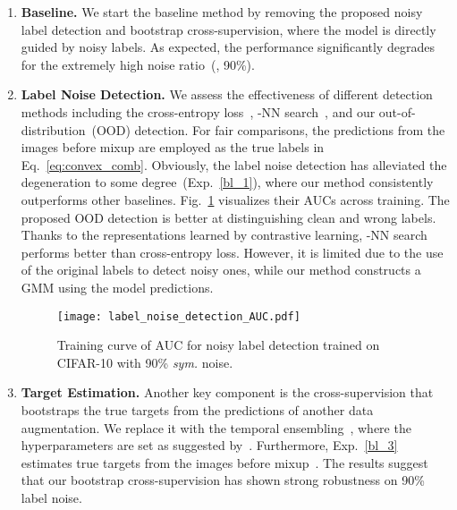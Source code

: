 \begin{enumerate}[label=\color{red!70!black}(\roman*),wide,labelindent=0pt,itemsep=0ex,parsep=0pt,topsep=0pt]
\item\label{bl_1} \textbf{Baseline.}\quad
We start the baseline method by removing the proposed noisy label detection and bootstrap cross-supervision, where the model is directly guided by noisy labels.  As expected, the performance significantly degrades for the extremely high noise ratio~(\ie, 90\%).


\item\label{bl_2} \textbf{Label Noise Detection.}\quad
We assess the effectiveness of different detection methods including the cross-entropy loss~\cite{arazo2019unsupervised,li2020dividemix}, -NN search~\cite{ortego2021multi}, and our out-of-distribution~(OOD) detection. For fair comparisons, the predictions from the images before mixup are employed as the true labels in Eq.~\eqref{eq:convex_comb}.
Obviously, the label noise detection has alleviated the degeneration to some degree~(Exp.~\ref{bl_1}), where our method consistently outperforms other baselines.
Fig.~\ref{fig:label_noise_detection_AUC} visualizes their AUCs across training.
The proposed OOD detection is better at distinguishing clean and wrong labels. Thanks to the representations learned by contrastive learning, -NN search performs better than cross-entropy loss. However, it is limited due to the use of the original labels to detect noisy ones, while our method constructs a GMM using the model predictions.

\begin{figure}[t]
    \centering
    \texttt{[image: label\_noise\_detection\_AUC.pdf]}
    \caption{
        Training curve of AUC for noisy label detection trained on CIFAR-10 with 90\% \textit{sym.} noise. 
    }
    \label{fig:label_noise_detection_AUC}\end{figure}

\item\label{bl_3} \textbf{Target Estimation.}\quad
Another key component is the cross-supervision that bootstraps the true targets from the predictions of another data augmentation. We replace it with the temporal ensembling~\cite{liu2020early}, where the hyperparameters are set as suggested by~\cite{liu2020early}. Furthermore, Exp.~\ref{bl_3} estimates true targets from the images before mixup~\cite{li2020dividemix,liu2020early,arazo2019unsupervised}. The results suggest that our bootstrap cross-supervision has shown strong robustness on 90\% label noise.


\end{enumerate}
